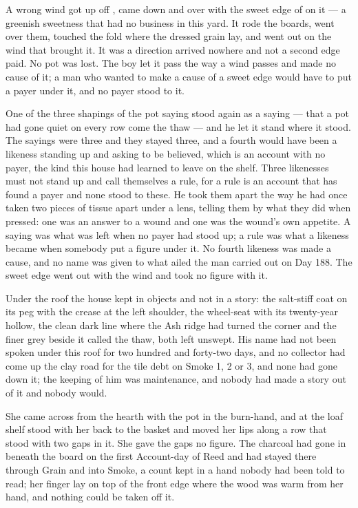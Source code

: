 A wrong wind got up off , came down  and over  with the sweet edge of  on it --- a greenish sweetness that had no business in this yard. It rode the boards, went over them, touched the fold where the dressed grain lay, and went out on the wind that brought it. It was a direction arrived nowhere and not a second edge paid. No pot was lost. The boy let it pass the way a wind passes and made no cause of it; a man who wanted to make a cause of a sweet edge would have to put a payer under it, and no payer stood to it.

One of the three shapings of the pot saying stood again as a saying --- that a pot had gone quiet on every row come the thaw --- and he let it stand where it stood. The sayings were three and they stayed three, and a fourth would have been a likeness standing up and asking to be believed, which is an account with no payer, the kind this house had learned to leave on the shelf. Three likenesses must not stand up and call themselves a rule, for a rule is an account that has found a payer and none stood to these. He took them apart the way he had once taken two pieces of tissue apart under a lens, telling them by what they did when pressed: one was an answer to a wound and one was the wound's own appetite. A saying was what was left when no payer had stood up; a rule was what a likeness became when somebody put a figure under it. No fourth likeness was made a cause, and no name was given to what ailed the man carried out on Day 188. The sweet edge went out with the wind and took no figure with it.

Under the roof the house kept  in objects and not in a story: the salt-stiff coat on its peg with the crease at the left shoulder, the wheel-seat with its twenty-year hollow, the clean dark line where the Ash ridge had turned the corner and the finer grey beside it called the thaw, both left unswept. His name had not been spoken under this roof for two hundred and forty-two days, and no collector had come up the clay road for the tile debt on Smoke 1, 2 or 3, and none had gone down it; the keeping of him was maintenance, and nobody had made a story out of it and nobody would.

She came across  from the hearth with the pot in the burn-hand, and at the loaf shelf stood with her back to the basket and moved her lips along a row that stood with two gaps in it. She gave the gaps no figure. The charcoal had gone in beneath the board on the first Account-day of Reed and had stayed there through Grain and into Smoke, a count kept in a hand nobody had been told to read; her finger lay on top of the front edge where the wood was warm from her hand, and nothing could be taken off it.

